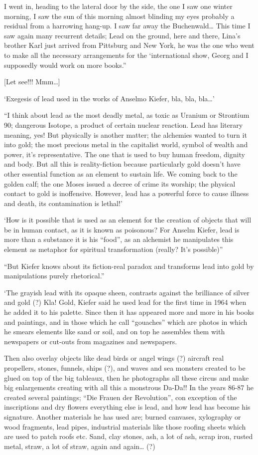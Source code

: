 \documentclass[smalldemyvopaper,11pt,twoside,onecolumn,openright,extrafontsizes]{memoir}
\begin{document}
I went in, heading to the lateral door by the side, the one I saw one winter morning, I saw the sun of this morning almost blinding my eyes probably a residual from a harrowing hang-up. I saw far away the 	Buchenwald… This time I saw again many recurrent details; Lead on the ground, here and there, Lina’s brother Karl just arrived from Pittsburg and New York, he was the one who went to make all the necessary arrangements for the ‘international show, Georg and I supposedly would work  on more books.”

[Let see!!! Mmm…]

‘Exegesis of lead used in the works of Anselmo Kiefer, bla, bla, bla…’

“I think about lead as the most deadly metal, as toxic as Uranium or Strontium 90; dangerous Isotope, a product of certain nuclear reaction. Lead has literary meaning, yes! But physically is another matter; the alchemies wanted to turn it into gold; the most precious metal in the capitalist world, symbol of wealth and power, it’s representative. The one that is used to buy human freedom, dignity and body. But all this is reality-fiction because particularly gold doesn’t have other essential function as an element to sustain life. We coming back to the golden calf; the one Moses issued a decree of crime its worship; the physical contact to gold is inoffensive. However, lead has a powerful force to cause illness and death, its contamination is lethal!’

‘How is it possible that is used as an element for the creation of objects that will be in human contact, as it is known as poisonous? For Anselm Kiefer, lead is more than a substance it is his “food”, as an alchemist  he manipulates this element as metaphor for spiritual transformation (really? It’s possible)”

“But Kiefer knows about its fiction-real paradox and transforms lead into gold by manipulations purely rhetorical.”

‘The grayish lead with its opaque sheen, contrasts against the brilliance of silver and gold (?) Kla! Gold, Kiefer said he used lead for the first time in 1964 when he added it to his palette. Since then it has appeared more and more in his books and paintings, and in those which he call “gouaches” which are photos in which he smears elements like sand or soil, and on top he assembles them with newspapers or cut-outs from magazines and newspapers.

Then also overlay objects like dead birds or angel wings (?) aircraft real  propellers, stones, funnels, ships (?), and waves and sea monsters created to be glued on top of the big tableaux, then he photographs all these circus and make big enlargements creating with all this a monstrous Da-Da!! In the years 86-87 he created several paintings; “Die Frauen der Revolution”, con exception of the inscriptions and dry flowers everything else is lead, and how lead has become his signature. Another materials he has used are; burned canvases, xylography or wood fragments, lead pipes, industrial materials like those roofing sheets which are used to patch roofs etc. Sand, clay stones, ash, a lot of ash, scrap iron, rusted metal, straw, a lot of straw, again and again… (?)
\end{document}
